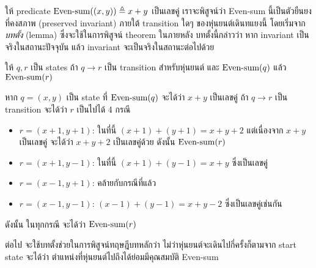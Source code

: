ให้ predicate $\textup{Even-sum}((x,y))\triangleq x+y$ เป็นเลขคู่ \enskip เราจะพิสูจน์ว่า Even-sum นี้เป็นตัวยืนยงที่คงสภาพ (preserved invariant) ภายใต้ transition ใดๆ ของหุ่นยนต์เดินทแยงนี้ โดยเริ่มจาก\emph{บทตั้ง} (lemma) ซึ่งจะใช้ในการพิสูจน์ theorem ในภายหลัง \enskip บทตั้งนี้กล่าวว่า หาก invariant เป็นจริงในสถานะปัจจุบัน แล้ว invariant จะเป็นจริงในสถานะต่อไปด้วย

\begin{lemma}\label{lemma:even-sum-trans}
ให้ $q,r$ เป็น states \enskip ถ้า $q\to r$ เป็น transition สำหรับหุ่นยนต์ และ $\textup{Even-sum}(q)$ แล้ว $\textup{Even-sum}(r)$
\begin{pf}
หาก $q=(x,y)$ เป็น state ที่ $\textup{Even-sum}(q)$ จะได้ว่า $x+y$ เป็นเลขคู่ \enskip ถ้า $q\to r$ เป็น transition จะได้ว่า $r$ เป็นไปได้ 4 กรณี
\begin{itemize}
\item $r=(x+1,y+1)$: ในที่นี้ $(x+1)+(y+1)=x+y+2$ แต่เนื่องจาก $x+y$ เป็นเลขคู่ จะได้ว่า $x+y+2$ เป็นเลขคู่ด้วย ดังนั้น $\textup{Even-sum}(r)$
\item $r=(x+1,y-1)$: ในที่นี้ $(x+1)+(y-1)=x+y$ ซึ่งเป็นเลขคู่
\item $r=(x-1,y+1)$: คล้ายกับกรณีที่แล้ว
\item $r=(x-1,y-1)$: $(x-1)+(y-1)=x+y-2$ ซึ่งเป็นเลขคู่เช่นกัน
\end{itemize}
ดังนั้น ในทุกกรณี จะได้ว่า $\textup{Even-sum}(r)$
\end{pf}
\end{lemma}

ต่อไป จะใช้บทตั้งช่วยในการพิสูจน์ทฤษฎีบทหลักว่า ไม่ว่าหุ่นยนต์จะเดินไปกี่ครั้งก็ตามจาก start state จะได้ว่า ตำแหน่งที่หุ่นยนต์ไปถึงได้ย่อมมีคุณสมบัติ Even-sum

